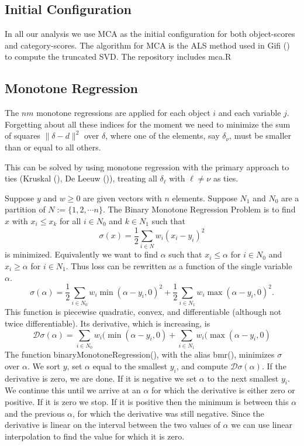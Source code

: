 \documentclass[
  12pt,
  letterpaper,
  DIV=11,
  numbers=noendperiod]{scrartcl}
\begin{document}
\subsection{Initial Configuration}\label{initial-configuration}

In all our analysis we use MCA as the initial configuration for both
object-scores and category-scores. The algorithm for MCA is the ALS
method used in Gifi () to compute the
truncated SVD. The repository includes mca.R

\subsection{Monotone Regression}\label{monotone-regression}

The \(nm\) monotone regressions are applied for each object \(i\) and
each variable \(j\). Forgetting about all these indices for the moment
we need to minimize the sum of squares \(\|\delta - d\|^2\) over
\(\delta\), where one of the elements, say \(\delta_\nu\), must be
smaller than or equal to all others.

This can be solved by using monotone regression with the primary
approach to ties (Kruskal (), De Leeuw
()), treating all \(\delta_\ell\) with
\(\ell \neq \nu\) as ties.

Suppose \(y\) and \(w \geq 0\) are given vectors with \(n\) elements.
Suppose \(N_1\) and \(N_0\) are a partition of
\(N := \{1,2,\cdots n\}\). The Binary Monotone Regression Problem is to
find \(x\) with \(x_i \leq x_k\) for all \(i \in N_0\) and \(k \in N_1\)
such that \[
  \sigma(x) = \frac12\sum_{i \in N} w_i(x_i - y_i)^2
\] is minimized. Equivalently we want to find \(\alpha\) such that
\(x_i \leq \alpha\) for \(i \in N_0\) and \(x_i \geq \alpha\) for
\(i \in N_1\). Thus loss can be rewritten as a function of the single
variable \(\alpha\). \[
  \sigma(\alpha) = \frac12\sum_{i \in N_0} w_i\min(\alpha - y_i,0)^2
                   + \frac12\sum_{i \in N_1} w_i\max(\alpha - y_i,0)^2.
\] This function is piecewise quadratic, convex, and differentiable
(although not twice differentiable). Its derivative, which is
increasing, is \[
  \mathcal{D}\sigma(\alpha)
  = \sum_{i \in N_0} w_i(\min(\alpha - y_i,0) + \sum_{i \in N_1} w_i(\max(\alpha - y_i, 0)
\] The function binaryMonotoneRegression(), with the alias bmr(),
minimizes \(\sigma\) over \(\alpha\). We sort \(y\), set \(\alpha\)
equal to the smallest \(y_i\), and compute
\(\mathcal{D}\sigma(\alpha)\). If the derivative is zero, we are done.
If it is negative we set \(\alpha\) to the next smallest \(y_i\). We
continue this until we arrive at an \(\alpha\) for which the derivative
is either zero or positive. If it is zero we stop. If it is positive
then the minimum is between this \(\alpha\) and the previous \(\alpha\),
for which the derivative was still negative. Since the derivative is
linear on the interval between the two values of \(\alpha\) we can use
linear interpolation to find the value for which it is zero.
\end{document}
